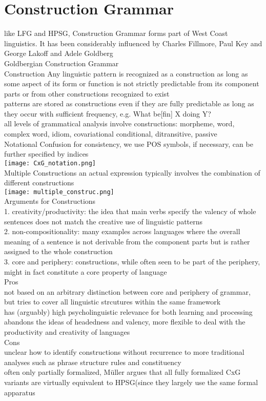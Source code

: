 \section{Construction Grammar}
{\tiny like LFG and HPSG, Construction Grammar forms part of West Coast linguistics. It has been considerably influenced by Charles Fillmore, Paul Key and George Lakoff and Adele Goldberg}\\
\scriptsize{Goldbergian Construction Grammar}\\
\scriptsize{Construction} {\tiny Any linguistic pattern is recognized as a construction as long as some aspect of its form or function is not strictly predictable from its component parts or from other constructions recognized to exist\\
patterns are stored as constructions even if they are fully predictable as long as they occur with sufficient frequency, e.g. What be[fin] X doing Y?\\
all levels of grammatical analysis involve constructions: morpheme, word, complex word, idiom, covariational conditional, ditransitive, passive
}\\
\scriptsize{Notational Confusion} {\tiny for consistency, we use POS symbols, if necessary, can be further specified by indices\\
\texttt{[image: CxG\_notation.png]}
}\\
\scriptsize{Multiple Constructions} {\tiny
an actual expression typically involves the combination of different constructions\\
\texttt{[image: multiple\_construc.png]}
}\\
\scriptsize{Arguments for Constructions}\\ {\tiny 1. creativity/productivity: the idea that main verbs specify the valency of whole sentences does not match the creative use of linguistic patterns\\
2. non-compositionality: many examples across languages where the overall meaning of a sentence is not derivable from the component parts but is rather assigned to the whole construction\\
3. core and periphery: constructions, while often seen to be part of the periphery, might in fact constitute a core property of language
}\\
\scriptsize{Pros}\\ 
{\tiny not based on an arbitrary distinction between core and periphery of grammar, but tries to cover all linguistic strcutures within the same framework\\
has (arguably) high psycholinguistic relevance for both learning and processing\\
abandons the ideas of headedness and valency, more flexible to deal with the productivity and creativity of languages
}\\
\scriptsize{Cons}\\ 
{\tiny unclear how to identify constructions without recurrence to more traditional analyses such as phrase structure rules and constituency\\
often only partially formalized, Müller argues that all fully formalized CxG variants are virtually equivalent to HPSG(since they largely use the same formal apparatus}